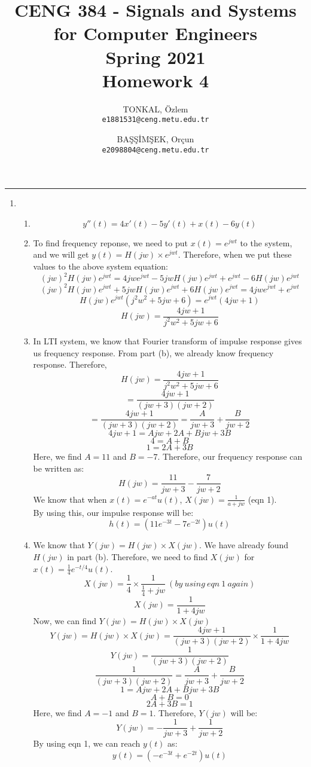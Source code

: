 \documentclass[10pt,a4paper, margin=1in]{article}
\author{
  TONKAL, Özlem\\
  \texttt{e1881531@ceng.metu.edu.tr}
  \and
  BAŞŞİMŞEK, Orçun\\
  \texttt{e2098804@ceng.metu.edu.tr}
}
\title{CENG 384 - Signals and Systems for Computer Engineers \\
Spring 2021 \\
Homework 4}
\begin{document}
\maketitle



\noindent\rule{19cm}{1.2pt}

\begin{enumerate}

\item %
    \begin{enumerate}
    \item %
    \[ y''(t) = 4x'(t) - 5y'(t) + x(t) -6y(t) \]
    \item %
    To find frequency reponse, we need to put $x(t) = e^{jwt}$ to the system, and we will get $y(t) = H(jw) \times e^{jwt}$. Therefore, when we put these values to the above system equation: 
    \[ (jw)^2H(jw)e^{jwt} = 4jwe^{jwt} -5jwH(jw)e^{jwt} + e^{jwt} -6H(jw)e^{jwt} \]
    \[ (jw)^2H(jw)e^{jwt} +5jwH(jw)e^{jwt} +6H(jw)e^{jwt}  = 4jwe^{jwt} + e^{jwt} \]
    \[ H(jw)e^{jwt}(j^2w^2 + 5jw + 6) = e^{jwt}(4jw+1) \]
    \[ H(jw) = \frac{4jw+1}{j^2w^2 + 5jw + 6}\]
    \item %
    In LTI system, we know that Fourier transform of impulse response gives us frequency response. From part (b), we already know frequency response. Therefore,
    \[ H(jw) = \frac{4jw+1}{j^2w^2 + 5jw + 6}\]
    \[ = \frac{4jw+1}{(jw+3)(jw+2)}\]
    \[ = \frac{4jw+1}{(jw+3)(jw+2)} = \frac{A}{jw+3} + \frac{B}{jw+2} \]
    \[ 4jw+1 = Ajw + 2A + Bjw + 3B \]
    \[ 4 = A+B \]
    \[ 1 = 2A+3B \]
    Here, we find $A = 11$ and $B=-7$. Therefore, our frequency response can be written as: 
    \[ H(jw) = \frac{11}{jw+3} - \frac{7}{jw+2} \]
    We know that when $x(t) = e^{-at}u(t)$, $X(jw) = \frac{1}{a + jw}$ (eqn 1). \\
     By using this, our impulse response will be:
    \[ h(t) = (11e^{-3t} -7e^{-2t})u(t) \]
    \item %
    We know that $Y(jw) = H(jw) \times X(jw)$. We have already found $H(jw)$ in part (b). Therefore, we need to find $X(jw)$ for $x(t) = \frac{1}{4}e^{-t/4}u(t)$.
    \[ X(jw) = \frac{1}{4} \times \frac{1}{\frac{1}{4} + jw} \ (by \ using \ eqn \ 1 \ again) \]
    \[ X(jw) = \frac{1}{1+4jw} \]
    Now, we can find $Y(jw) = H(jw) \times X(jw)$
    \[ Y(jw) = H(jw) \times X(jw) = \frac{4jw+1}{(jw+3)(jw+2)} \times \frac{1}{1+4jw} \]
    \[ Y(jw) = \frac{1}{(jw+3)(jw+2)} \]
    \[ \frac{1}{(jw+3)(jw+2)} = \frac{A}{jw+3} + \frac{B}{jw+2} \]
    \[ 1 = Ajw + 2A + Bjw + 3B \]
    \[ A+B = 0 \]
    \[ 2A + 3B = 1 \]
    Here, we find $A = -1$ and $B = 1$. Therefore, $Y(jw)$ will be:
    \[ Y(jw) = - \frac{1}{jw+3} + \frac{1}{jw+2} \]
    By using eqn 1, we can reach $y(t)$ as:
    \[ y(t) = (-e^{-3t} + e^{-2t})u(t) \]
    \end{enumerate}


\end{enumerate}
\end{document}
